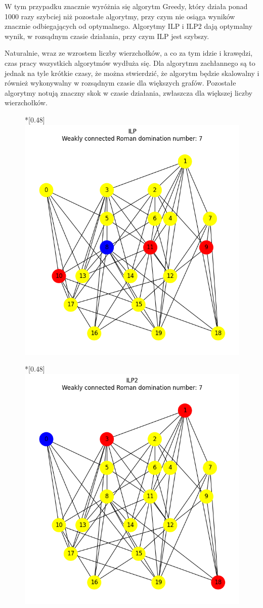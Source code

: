     W tym przypadku znacznie wyróżnia się algorytm Greedy, który działa ponad 1000 razy szybciej niż pozostałe algorytmy, przy czym nie osiąga wyników znacznie odbiegających od optymalnego. Algorytmy ILP i ILP2 dają optymalny wynik, w rozsądnym czasie działania, przy czym ILP jest szybszy.

    Naturalnie, wraz ze wzrostem liczby wierzchołków, a co za tym idzie i krawędzi, czas pracy wszystkich algorytmów wydłuża się. Dla algorytmu zachłannego są to jednak na tyle krótkie czasy, że można stwierdzić, że algorytm będzie skalowalny i również wykonywalny w rozsądnym czasie dla większych grafów. Pozostałe algorytmy notują znaczny skok w czasie działania, zwłaszcza dla większej liczby wierzchołków.

    \begin{figure}[H]
        \centering
        \begin{subcaptionbox}*{}[0.48\linewidth]
            {\includegraphics[width=0.75\linewidth]{assets/plots/ILP/ErdosRenyi_sparse_n20_i2_results.png}}
        \end{subcaptionbox}
        \hfill
        \begin{subcaptionbox}*{}[0.48\linewidth]
            {\includegraphics[width=0.75\linewidth]{assets/plots/ILP2/ErdosRenyi_sparse_n20_i2_results.png}}

\end{subcaptionbox}
\end{figure}
